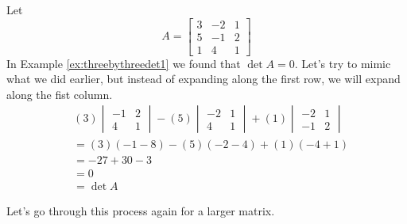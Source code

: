 \documentclass{ximera}
\begin{document}
\begin{example}\label{init:expansionfirstcol1}
Let 
$$A=\begin{bmatrix}3&-2&1\\5&-1&2\\1&4&1\end{bmatrix}$$
In Example \ref{ex:threebythreedet1} we found that $\det{A}=0$.  Let's try to mimic what we did earlier, but instead of expanding along the first row, we will expand along the fist column.  
\begin{align*}
&(3)\begin{vmatrix}-1&2\\4&1\end{vmatrix}-(5)\begin{vmatrix}-2&1\\4&1\end{vmatrix}+(1)\begin{vmatrix}-2&1\\-1&2\end{vmatrix}\\
&=(3)(-1-8)-(5)(-2-4)+(1)(-4+1)\\
&=-27+30-3\\
&=0\\
&=\det{A}
\end{align*}
\end{example}

Let's go through this process again for a larger matrix.
\end{document}
